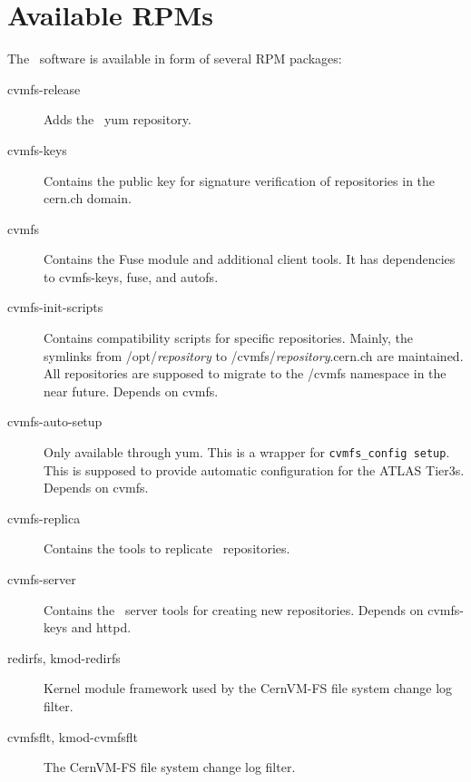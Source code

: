 \chapter{Available RPMs}
\label{apx:rpms}

The \cvmfs\ software is available in form of several RPM packages:
\begin{description}
	\item[cvmfs-release] Adds the \cvmfs\ yum repository.
	\item[cvmfs-keys] Contains the public key for signature verification of repositories in the cern.ch domain.
	\item[cvmfs] Contains the Fuse module and additional client tools.  It has dependencies to cvmfs-keys, fuse, and autofs.
	\item[cvmfs-init-scripts] Contains compatibility scripts for specific repositories.  
		Mainly, the symlinks from /opt/\emph{repository} to /cvmfs/\emph{repository}.cern.ch are maintained.
		All repositories are supposed to migrate to the /cvmfs namespace in the near future.
		Depends on cvmfs.
	\item[cvmfs-auto-setup] Only available through yum. 
		This is a wrapper for \lstinline{cvmfs_config setup}. 
		This is supposed to provide automatic configuration for the ATLAS Tier3s.
		Depends on cvmfs.
	\item[cvmfs-replica] Contains the tools to replicate \cvmfs\ repositories.
	\item[cvmfs-server] Contains the \cvmfs\ server tools for creating new repositories.
		Depends on cvmfs-keys and httpd.
	\item[redirfs, kmod-redirfs] Kernel module framework used by the CernVM-FS file system change log filter. 
	\item[cvmfsflt, kmod-cvmfsflt] The CernVM-FS file system change log filter.
\end{description}
